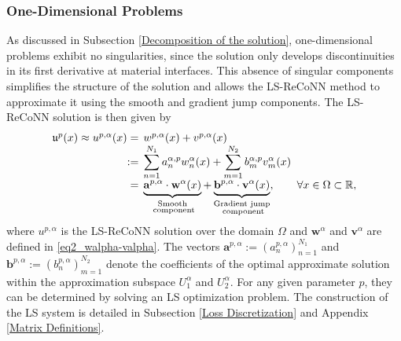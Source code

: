 \documentclass[oneside]{article}
\begin{document}
\subsubsection*{One-Dimensional Problems}
As discussed in Subsection \ref{Decomposition of the solution}, one-dimensional problems exhibit no singularities, since the solution only develops discontinuities in its first derivative at material interfaces. This absence of singular components simplifies the structure of the solution and allows the LS-ReCoNN method to approximate it using the smooth and gradient jump components. The LS-ReCoNN solution is then given by
\begin{align}\label{eq2_LS-ReCoNN_solution_1D}
\begin{array}{rl}
     \mathfrak{u}^p(x) \approx u^{p, \alpha}(x) =& \hspace{-2mm}w^{p, \alpha}(x) + v^{p, \alpha}(x)\\
      := &\hspace{-2mm}\displaystyle \sum_{n = 1}^{N_1} a^{\alpha, p}_n w^{\alpha}_n(x) + \sum_{m = 1}^{N_2} b^{\alpha, p}_m v^{\alpha}_m(x)\\[3mm]
     = &\hspace{-2mm}\displaystyle \underbrace{\mathbf{a}^{p,\alpha} \cdot \mathbf{w}^{\alpha}(x)}_{\substack{\text{Smooth}\\ \text{ component}}} + \underbrace{\mathbf{b}^{p,\alpha} \cdot \mathbf{v}^{\alpha}(x)}_{\substack{\text{Gradient jump}\\ \text{ component}}}, \qquad \forall x \in \Omega \subset \mathbb{R},\\
\end{array}
\end{align}
where $u^{p, \alpha}$ is the LS-ReCoNN solution over the domain $\Omega$ and $\mathbf{w}^{\alpha}$ and $\mathbf{v}^{\alpha}$ are defined in \eqref{eq2_walpha-valpha}. The vectors $\mathbf{a}^{p,\alpha}:= (a_n^{p,\alpha})_{n = 1}^{N_1}$ and $\mathbf{b}^{p,\alpha}:= (b_n^{p,\alpha})_{m = 1}^{N_2}$ denote the coefficients of the optimal approximate solution within the approximation subspace $U_1^\alpha$ and $U_2^\alpha$. For any given parameter $p$, they can be determined by solving an LS optimization problem. The construction of the LS system is detailed in Subsection \ref{Loss Discretization} and Appendix \ref{Matrix Definitions}.
\end{document}
